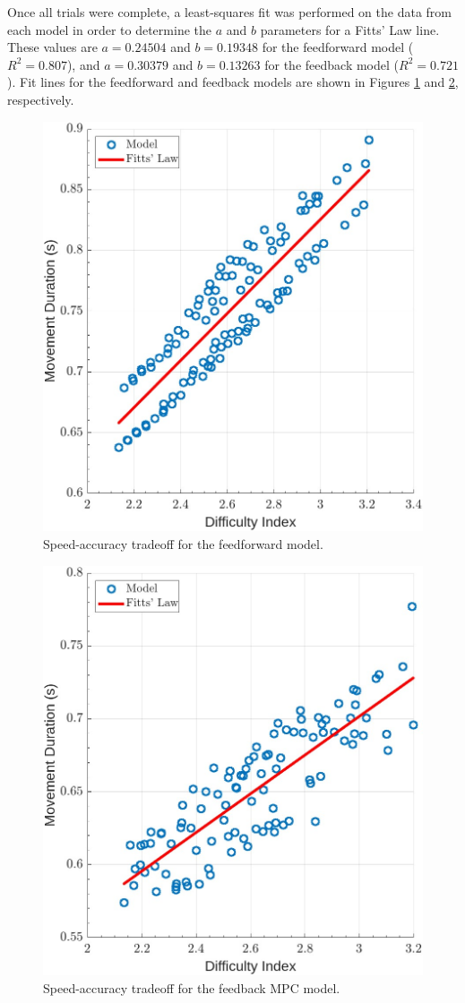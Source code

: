 \documentclass[letterpaper, 10pt, conference]{ieeeconf}
\begin{document}
Once all trials were complete, a least-squares fit was performed on the data from each model in order to determine the $a$ and $b$ parameters for a Fitts' Law line. These values are $a = 0.24504$ and $b = 0.19348$ for the feedforward model ($R^2 = 0.807$), and $a = 0.30379$ and $b = 0.13263$ for the feedback model ($R^2 = 0.721$). Fit lines for the feedforward and feedback models are shown in Figures \ref{fig:FittsLawSingle} and \ref{fig:FittsLawMPC}, respectively.   

\begin{figure}[h]
    \centering
    \includegraphics[width=0.8\linewidth]{images/final_fitts_law_single.jpg}
    \caption{Speed-accuracy tradeoff for the feedforward model.}
    \label{fig:FittsLawSingle}
\end{figure}

\begin{figure}[h]
    \centering
    \includegraphics[width=0.8\linewidth]{images/final_fitts_law_mpc.jpg}
    \caption{Speed-accuracy tradeoff for the feedback MPC model.}
    \label{fig:FittsLawMPC}
\end{figure}
\end{document}
